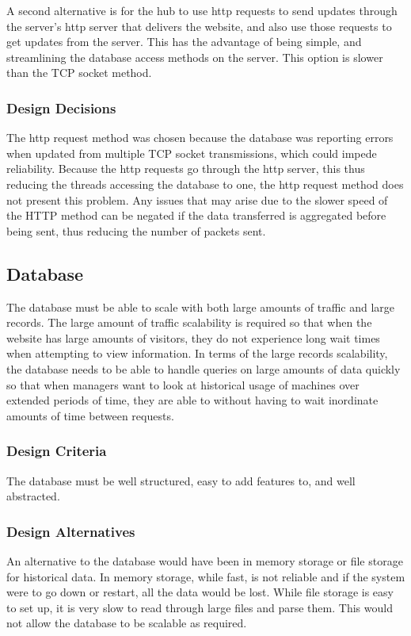 \documentclass[PPFS.tex]{template/subfiles}
\begin{document}
A second alternative is for the hub to use http requests to send updates through the server's http server that delivers the website, and also use those requests to get updates from the server. This has the advantage of being simple, and streamlining the database access methods on the server. This option is slower than the TCP socket method.

\subsubsection{Design Decisions}
The http request method was chosen because the database was reporting errors when updated from multiple TCP socket transmissions, which could impede reliability. Because the http requests go through the http server, this thus reducing the threads accessing the database to one, the http request method does not present this problem. Any issues that may arise due to the slower speed of the HTTP method can be negated if the data transferred is aggregated before being sent, thus reducing the number of packets sent.

\subsection{Database}
The database must be able to scale with both large amounts of traffic and large records. The large amount of traffic scalability is required so that when the website has large amounts of visitors, they do not experience long wait times when attempting to view information. In terms of the large records scalability, the database needs to be able to handle queries on large amounts of data quickly so that when managers want to look at historical usage of machines over extended periods of time, they are able to without having to wait inordinate amounts of time between requests.

\subsubsection{Design Criteria}
The database must be well structured, easy to add features to, and well abstracted.

\subsubsection{Design Alternatives}
An alternative to the database would have been in memory storage or file storage for historical data. In memory storage, while fast, is not reliable and if the system were to go down or restart, all the data would be lost. While file storage is easy to set up, it is very slow to read through large files and parse them. This would not allow the database to be scalable as required.
\end{document}
